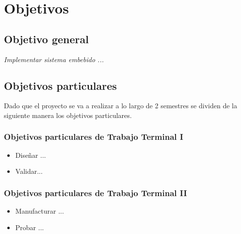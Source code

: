 \section{Objetivos}

\subsection{Objetivo general}
\label{Objetivo general}

\begin{center}
	\textit{Implementar sistema embebido ...}
\end{center}

\subsection{Objetivos particulares}
\label{Objetivos part}
Dado que el proyecto se va a realizar a lo largo de 2 semestres se dividen de la siguiente manera los objetivos particulares.

\subsubsection{Objetivos particulares de Trabajo Terminal I}
\begin{itemize}
	\item Diseñar ...
	\item Validar...
\end{itemize}

\subsubsection{Objetivos particulares de Trabajo Terminal II}
\begin{itemize}
	\item Manufacturar ...
	\item Probar ...
\end{itemize}